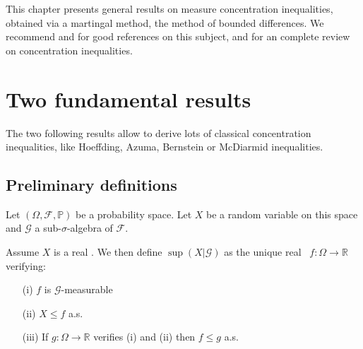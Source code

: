 This chapter presents general results on measure concentration inequalities, obtained via a martingal method, the method of bounded differences. We recommend \cite{McDiarmid98} and \cite{Janson2002} for good references on this subject, and \cite{BLM2013} for an complete review on concentration inequalities.



\section{Two fundamental results}
The two following results allow to derive lots of classical concentration inequalities, like
Hoeffding, Azuma, Bernstein or McDiarmid inequalities.

\subsection{Preliminary definitions}
Let $(\Omega,\mathcal{F},\mathbb{P})$ be a probability space.
Let $X$ be a random variable on this space and $\mathcal{G}$ a sub-$\sigma$-algebra of $\mathcal{F}$.

\begin{definition} Assume $X$ is a real \rv. We then define $\sup(X|\mathcal{G})$ as the unique real \rv~$f:\Omega \rightarrow \mathbb{R}$ verifying:
\begin{itemize}
\item[(i)] $f$ is $\mathcal{G}$-measurable
\item[(ii)] $X \leq f$ a.s.
\item[(iii)] If  $g:\Omega \rightarrow \mathbb{R}$ verifies (i) and (ii) then $ f\le g$ a.s.
\end{itemize}
\end{definition}

